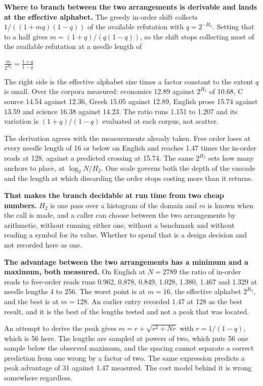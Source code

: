 \textbf{Where to branch between the two arrangements is derivable and lands at the effective alphabet.} The greedy in-order shift collects \(1/((1+mq)(1-q))\) of the available refutation with \(q = 2^{-H_2}\). Setting that to a half gives \(m = (1+q)/(q(1-q))\), so the shift stops collecting most of the available refutation at a needle length of

\(\frac{m}{2^{H_2}} = \frac{1+q}{1-q}\)

The right side is the effective alphabet size times a factor constant to the extent \(q\) is small. Over the corpora measured: economics 12.89 against \(2^{H_2}\) of 10.68, C source 14.54 against 12.36, Greek 15.05 against 12.89, English prose 15.74 against 13.59 and science 16.38 against 14.23. The ratio runs 1.151 to 1.207 and its variation is \((1+q)/(1-q)\) evaluated at each corpus, not scatter.

The derivation agrees with the measurements already taken. Free order loses at every needle length of 16 or below on English and reaches 1.47 times the in-order reads at 128, against a predicted crossing at 15.74. The same \(2^{H_2}\) sets how many anchors to place, at \(\log_2 N / H_2\). One scale governs both the depth of the cascade and the length at which discarding the order stops costing more than it returns.

\textbf{That makes the branch decidable at run time from two cheap numbers.} \(H_2\) is one pass over a histogram of the domain and \(m\) is known when the call is made, and a caller can choose between the two arrangements by arithmetic, without running either one, without a benchmark and without reading a symbol for its value. Whether to spend that is a design decision and not recorded here as one.

\textbf{The advantage between the two arrangements has a minimum and a maximum, both measured.} On English at \(N = 2789\) the ratio of in-order reads to free-order reads runs 0.962, 0.878, 0.849, 1.028, 1.380, 1.467 and 1.329 at needle lengths 4 to 256. The worst point is at \(m = 16\), the effective alphabet \(2^{H_2}\), and the best is at \(m = 128\). An earlier entry recorded 1.47 at 128 as the best result, and it is the best of the lengths tested and not a peak that was located.

An attempt to derive the peak gives \(m = r + \sqrt{r^2 + Nr}\) with \(r = 1/(1-q)\), which is 56 here. The lengths are sampled at powers of two, which puts 56 one sample below the observed maximum, and the spacing cannot separate a correct prediction from one wrong by a factor of two. The same expression predicts a peak advantage of 31 against 1.47 measured. The cost model behind it is wrong somewhere regardless.

